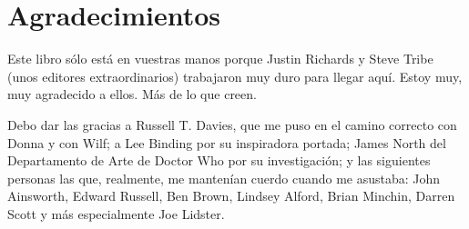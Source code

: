 \section{Agradecimientos}

Este libro sólo está en vuestras manos porque Justin Richards y Steve
Tribe (unos editores extraordinarios) trabajaron muy duro para llegar
aquí. Estoy muy, muy agradecido a ellos. Más de lo que creen.

Debo dar las gracias a Russell T. Davies, que me puso en el camino
correcto con Donna y con Wilf; a Lee Binding por su inspiradora portada;
James North del Departamento de Arte de Doctor Who por su investigación;
y las siguientes personas las que, realmente, me mantenían cuerdo cuando
me asustaba: John Ainsworth, Edward Russell, Ben Brown, Lindsey Alford,
Brian Minchin, Darren Scott y más especialmente Joe Lidster.
